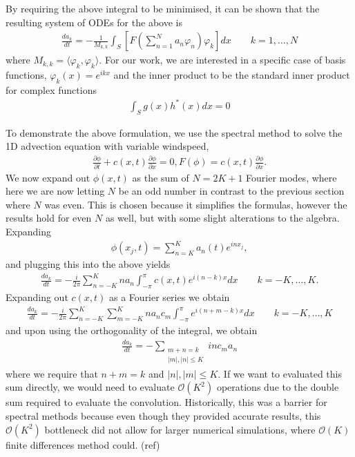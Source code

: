 By requiring the above integral to be minimised, it can be shown\cite{durran} that the resulting system of ODEs for the above is
\begin{align}
\frac{d a_{k}}{dt} = -\frac{1}{M_{k,k}}\int_{S}\left[F\left(\sum_{n=1}^{N}a_{n}\varphi_{n}\right)\varphi_{k}\right]dx \qquad k=1,\ldots,N
\end{align}
where $M_{k,k}=\langle \varphi_{k},\varphi_{k}\rangle$. For our work, we are interested in a specific case of basis functions, $\varphi_{k}(x)=e^{ikx}$ and the inner product to be the standard inner product for complex functions
\begin{align}
\int_{S}g(x)h^{*}(x)dx=0 
\end{align}

To demonstrate the above formulation, we use the spectral method to solve the 1D advection equation with variable windspeed,
\begin{align}
\frac{\partial\phi}{\partial t} + c(x,t)\frac{\partial \phi}{\partial x} =0, F(\phi) = c(x,t)\frac{\partial \phi}{\partial x}.
\end{align}
We now expand out $\phi(x,t)$ as the sum of $N=2K+1$ Fourier modes, where here we are now letting $N$ be an odd number in contrast to the previous section where $N$ was even. This is chosen because it simplifies the formulas, however the results hold for even $N$ as well, but with some slight alterations to the algebra. Expanding
\begin{align}
\phi(x_{j},t)= \sum_{n=K}^{K}a_{n}(t)e^{inx_{j}},
\end{align}
and plugging this into the above yields
\begin{align}
\frac{d a_{k}}{dt} = -\frac{i}{2\pi}\sum_{n=-K}^{K}na_{n}\int_{-\pi}^{\pi}c(x,t)e^{i(n-k)x}dx \qquad k=-K,\ldots,K.
\end{align}
Expanding out $c(x,t)$ as a Fourier series we obtain
\begin{align} 
\frac{d a_{k}}{dt} = -\frac{i}{2\pi}\sum_{n=-K}^{K}\sum_{m=-K}^{K}na_{n}c_{m}\int_{-\pi}^{\pi}e^{i(n+m-k)x}dx \qquad k=-K,\ldots,K
\end{align}
and upon using the orthogonality of the integral, we obtain
\begin{align}
\frac{da_{k}}{dt} = -\sum_{\substack{m+n=k\\ |m|,|n|\le K}} inc_{m}a_{n}
\end{align}
where we require that $n+m=k$ and $|n|,|m|\le K$. If we want to evaluated this sum directly, we would need to evaluate $\mathcal{O}(K^{2})$ operations due to the double sum required to evaluate the convolution. Historically, this was a barrier for spectral methods because even though they provided accurate results, this $\mathcal{O}(K^{2})$ bottleneck did not allow for larger numerical simulations, where $\mathcal{O}(K)$ finite differences method could. (ref)


